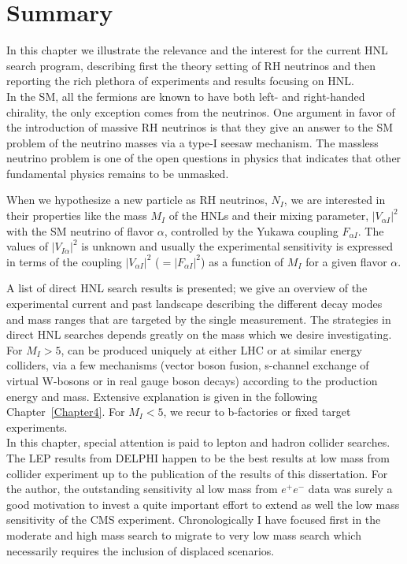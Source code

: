 \section{Summary}
In this chapter we illustrate the relevance and the interest for the
current HNL search program, describing first the theory setting of RH
neutrinos and then reporting the rich plethora of experiments and results
focusing on HNL.\\
In the SM, all the fermions are known to have both
left- and right-handed chirality, the only exception comes from the
neutrinos. One argument in favor of the introduction of massive RH
neutrinos is that they give an answer to the SM problem of the
neutrino masses via a type-I seesaw mechanism. The massless neutrino
problem is one of the open questions in physics that indicates that
other fundamental physics remains to be unmasked.

When we hypothesize a new particle as RH neutrinos, $N_{I}$, we
are interested in their properties like the mass $M_I$ of the HNLs and
their mixing parameter, $|V_{\alpha I}|^2$  with the SM neutrino of flavor $\alpha$,
controlled by the Yukawa coupling $F_{\alpha I}$. The values of $|V_{I
  \alpha}|^2$ is unknown and usually the experimental
sensitivity is expressed in terms of the coupling $|V_{\alpha I}|^2$
($= |F_{\alpha I}|^2$) as a function of $M_I$ for a given flavor
$\alpha$.

A list of direct HNL search results is presented; we give an overview
of the experimental current and past landscape describing the different decay modes and
mass ranges that are targeted by the single measurement.
The strategies in direct HNL searches depends greatly on the mass
which we desire investigating. For $M_{I} > 5$\GeV, \hnl can be
produced uniquely at either LHC or at similar energy colliders, via a few
mechanisms (vector boson fusion, s-channel exchange of virtual
W-bosons or in real gauge boson decays) according to the production
energy and \hnl mass. Extensive explanation is given in the following
Chapter~\ref{Chapter4}. For $M_{I} < 5$\GeV, we recur to b-factories
or fixed target experiments. \\
In this chapter, special attention is paid to lepton and hadron collider
searches. The LEP results from DELPHI happen to be the best results at
low mass from collider experiment up to the publication of the results
of this dissertation. For the author, the outstanding sensitivity al low mass from
$e^{+}e^{-}$ data was surely a good motivation to invest a quite
important effort to extend as well the low mass sensitivity of
the CMS experiment. Chronologically I have focused first in the
moderate and high mass search to migrate to very low mass search which
necessarily requires the inclusion of displaced scenarios.

